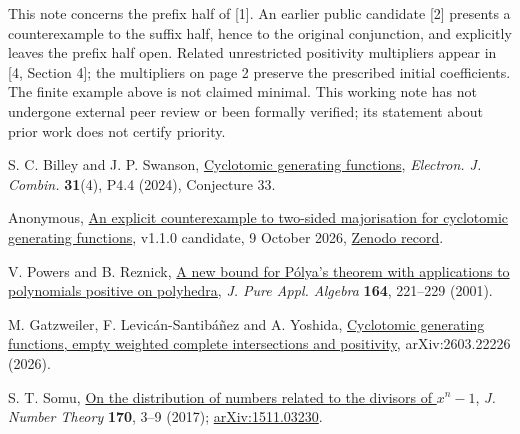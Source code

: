 \documentclass[11pt]{article}
\newcommand{\sect}[1]{\vspace{4pt}{\large\bfseries\color{ink}#1}\par}
\begin{document}
\sect{Scope and references}
This note concerns the prefix half of [1]. An earlier public candidate [2] presents a counterexample to the suffix half, hence to the original conjunction, and explicitly leaves the prefix half open. Related unrestricted positivity multipliers appear in [4, Section 4]; the multipliers on page 2 preserve the prescribed initial coefficients. The finite example above is not claimed minimal. This working note has not undergone external peer review or been formally verified; its statement about prior work does not certify priority.

\begin{enumerate}[label={[\arabic*]},nosep,leftmargin=2em]
\item S. C. Billey and J. P. Swanson, \href{https://doi.org/10.37236/12687}{Cyclotomic generating functions}, \emph{Electron. J. Combin.} \textbf{31}(4), P4.4 (2024), Conjecture 33.
\item Anonymous, \href{https://www.evidencepress.org/releases/cgf-majorisation-counterexample/}{An explicit counterexample to two-sided majorisation for cyclotomic generating functions}, v1.1.0 candidate, 9 October 2026, \href{https://doi.org/10.5281/zenodo.23270364}{Zenodo record}.
\item V. Powers and B. Reznick, \href{https://reznick.web.illinois.edu/11200.pdf}{A new bound for P\'olya's theorem with applications to polynomials positive on polyhedra}, \emph{J. Pure Appl. Algebra} \textbf{164}, 221--229 (2001).
\item M. Gatzweiler, F. Levic\'an-Santib\'a\~nez and A. Yoshida, \href{https://arxiv.org/abs/2603.22226}{Cyclotomic generating functions, empty weighted complete intersections and positivity}, arXiv:2603.22226 (2026).
\item S. T. Somu, \href{https://doi.org/10.1016/j.jnt.2016.06.004}{On the distribution of numbers related to the divisors of $x^n-1$}, \emph{J. Number Theory} \textbf{170}, 3--9 (2017); \href{https://arxiv.org/abs/1511.03230}{arXiv:1511.03230}.
\end{enumerate}
\end{document}
